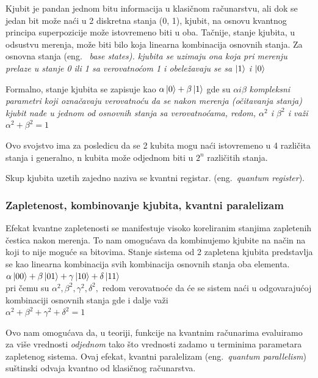 \documentclass[a4paper]{article}
\begin{document}
{Kjubit je pandan jednom bitu informacija u klasičnom računarstvu, ali dok se jedan bit može naći u 2 diskretna stanja (0, 1),
kjubit, na osnovu kvantnog principa superpozicije može istovremeno biti u oba.
Tačnije, stanje kjubita, u odsustvu merenja, može biti bilo koja linearna kombinacija osnovnih stanja.
Za osnovna stanja (eng. ~\em base states). kjubita se uzimaju ona koja pri merenju prelaze u stanje 0 ili 1 sa verovatnoćom 1 i obeležavaju se sa $\ket{1}$ i $\ket{0}$

Formalno, stanje kjubita se zapisuje kao $\alpha \ket{0} + \beta \ket{1}$ gde su $\alpha i \beta$ \em{kompleksni} parametri koji označavaju verovatnoću da se nakon merenja (očitavanja stanja) kjubit nađe u jednom od osnovnih stanja sa verovatnoćama, redom, $\alpha^2$ i $\beta^2$ i važi $\alpha^2+\beta^2=1$

Ovo svojstvo ima za posledicu da se 2 kubita mogu naći istovremeno u 4 različita stanja i generalno, n kubita može odjednom biti u $2^n$ različitih stanja.

Skup kjubita uzetih zajedno naziva se kvantni registar. (eng.~\emph{quantum register}).

\subsubsection{Zapletenost, kombinovanje kjubita, kvantni paralelizam}
\label{entanglement}

Efekat kvantne zapletenosti se manifestuje visoko koreliranim stanjima zapletenih čestica nakon merenja.
To nam omogućava da kombinujemo kjubite na način na koji to nije moguće sa bitovima. Stanje sistema od 2 zapletena kjubita predstavlja se kao linearna kombinacija svih kombinacija osnovnih stanja oba elementa.\\

$\alpha\ket{00} + \beta\ket{01} + \gamma\ket{10} + \delta\ket{11}$\\

pri čemu su $\alpha^2, \beta^2, \gamma^2, \delta^2,$ redom verovatnoće da će se sistem naći u odgovarajućoj kombinaciji osnovnih stanja gde i dalje važi\\

$\alpha^2+\beta^2+\gamma^2+\delta^2=1$

Ovo nam omogućava da, u teoriji, funkcije na kvantnim računarima evaluiramo za više vrednosti \emph{odjednom} tako što vrednosti zadamo u terminima parametara zapletenog sistema. Ovaj efekat, kvantni paralelizam (eng.~\emph{quantum parallelism}) suštinski odvaja kvantno od klasičnog računarstva.

}
\end{document}
